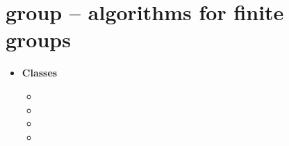 

 \section{group -- algorithms for finite groups}
 \begin{itemize}
   \item {\bf Classes}
   \begin{itemize}
     \item {}
     \item {}
     \item {}
     \item {}
   \end{itemize}
 \end{itemize}

\C

